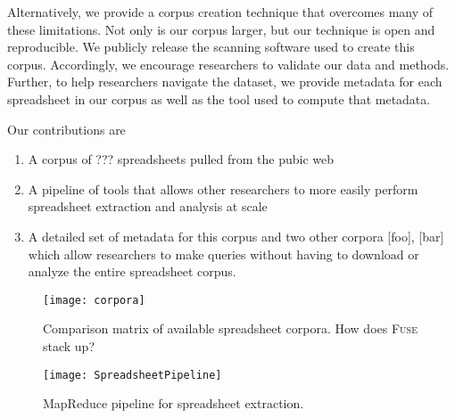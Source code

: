 \documentclass[conference]{IEEEtran}
\begin{document}
Alternatively, we provide a corpus creation technique that overcomes many of these limitations. 
Not only is our corpus larger, but our technique is open and reproducible.  
We publicly release the scanning software used to create this corpus.
Accordingly, we encourage researchers to validate our data and methods.
Further, to help researchers navigate the dataset, we provide metadata for each spreadsheet in our corpus as well as the tool used to compute that metadata.



Our contributions are 
\begin{enumerate}
\item A corpus of ??? spreadsheets pulled from the pubic web
\item A pipeline of tools that allows other researchers to more easily perform spreadsheet extraction and analysis at scale
\item A detailed set of metadata for this corpus and two other corpora [foo], [bar]  which allow researchers to make queries without having to download or analyze the entire spreadsheet corpus.  
\end{enumerate}


\begin{figure}[!t]
\centering
\texttt{[image: corpora]}
\caption{Comparison matrix of available spreadsheet corpora. How does \textsc{Fuse} stack up?}
\label{fig:corpora}
\end{figure}

\begin{figure}[!t]
\centering
\texttt{[image: SpreadsheetPipeline]}
\caption{MapReduce pipeline for spreadsheet extraction.}
\label{fig:mrpipeline}
\end{figure}
\end{document}

